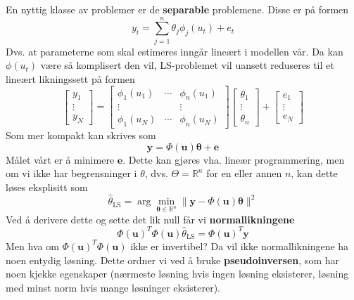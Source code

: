 \documentclass[12pt]{article}
\begin{document}
En nyttig klasse av problemer er de \textbf{separable} problemene. Disse er på formen
\begin{equation}
y_{t}=\sum_{j=1}^{n} \theta_{j} \phi_{j}\left(u_{t}\right)+e_{t}
\end{equation}
Dvs. at parameterne som skal estimeres inngår lineært i modellen vår. Da kan $\phi(u_t)$ være så komplisert den vil, LS-problemet vil uansett reduseres til et lineært likningssett på formen
\begin{equation}
\left[\begin{array}{c}
{y_{1}} \\
{\vdots} \\
{y_{N}}
\end{array}\right]=\left[\begin{array}{ccc}
{\phi_{1}\left(u_{1}\right)} & {\cdots} & {\phi_{n}\left(u_{1}\right)} \\
{\vdots} & {} & {\vdots} \\
{\phi_{1}\left(u_{N}\right)} & {\cdots} & {\phi_{n}\left(u_{N}\right)}
\end{array}\right]\left[\begin{array}{c}
{\theta_{1}} \\
{\vdots} \\
{\theta_{n}}
\end{array}\right]+\left[\begin{array}{c}
{e_{1}} \\
{\vdots} \\
{e_{N}}
\end{array}\right]
\end{equation}
Som mer kompakt kan skrives som
\begin{equation}
\boldsymbol{y}=\Phi(\boldsymbol{u}) \boldsymbol{\theta}+\boldsymbol{e}
\end{equation}
Målet vårt er å minimere $\mathbf{e}$. Dette kan gjøres vha. lineær programmering, men om vi ikke har begrensninger i $\theta$, dvs. $\Theta = \mathbb{R}^n$ for en eller annen $n$, kan dette løses eksplisitt som
\begin{equation}
\widehat{\theta}_{\mathrm{LS}}=\arg \min _{\boldsymbol{\theta} \in \mathbb{R}^{n}}\|\boldsymbol{y}-\Phi(\boldsymbol{u}) \boldsymbol{\theta}\|^{2}
\end{equation}
Ved å derivere dette og sette det lik null får vi \textbf{normallikningene}
\begin{equation}
\Phi(\boldsymbol{u})^{T} \Phi(\boldsymbol{u}) \widehat{\theta}_{\mathrm{LS}}=\Phi(\boldsymbol{u})^{T} \boldsymbol{y}
\end{equation}
Men hva om $
\Phi(\boldsymbol{u})^{T} \Phi(\boldsymbol{u})
$ ikke er invertibel? Da vil ikke normallikningene ha noen entydig løsning. Dette ordner vi ved å bruke \textbf{pseudoinversen}, som har noen kjekke egenskaper (nærmeste løsning hvis ingen løsning eksisterer, løsning med minst norm hvis mange løsninger eksisterer).
\end{document}
